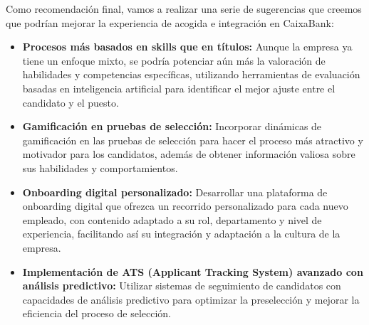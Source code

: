 Como recomendación final, vamos a realizar una serie de sugerencias que creemos que podrían mejorar la experiencia de acogida e integración en CaixaBank:
\begin{itemize}
    \item \textbf{Procesos más basados en skills que en títulos:} Aunque la empresa ya tiene un enfoque mixto, se podría potenciar aún más la valoración de habilidades y competencias específicas, utilizando herramientas de evaluación basadas en inteligencia artificial para identificar el mejor ajuste entre el candidato y el puesto.
    \item \textbf{Gamificación en pruebas de selección:} Incorporar dinámicas de gamificación en las pruebas de selección para hacer el proceso más atractivo y motivador para los candidatos, además de obtener información valiosa sobre sus habilidades y comportamientos.
    \item \textbf{Onboarding digital personalizado:} Desarrollar una plataforma de onboarding digital que ofrezca un recorrido personalizado para cada nuevo empleado, con contenido adaptado a su rol, departamento y nivel de experiencia, facilitando así su integración y adaptación a la cultura de la empresa.
    \item \textbf{Implementación de ATS (Applicant Tracking System) avanzado con análisis predictivo:} Utilizar sistemas de seguimiento de candidatos con capacidades de análisis predictivo para optimizar la preselección y mejorar la eficiencia del proceso de selección.
\end{itemize}
